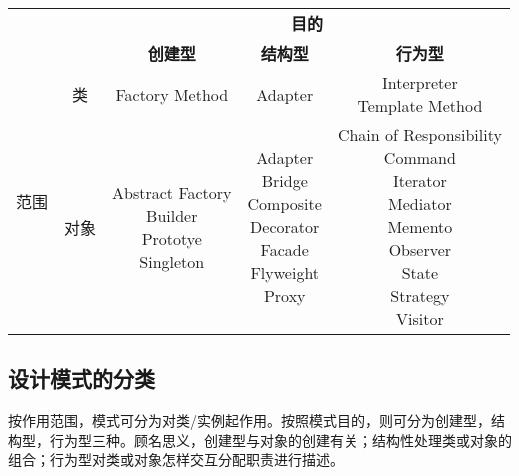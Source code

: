 \begin{table}[H]
    \centering
    \setlength{\tabcolsep}{4mm}
    \begin{tabular}{c|c|c|c|c}
        \toprule
        & & \multicolumn{3}{c}{\textbf{目的}} \\
        \cline{3-5}
        & & \textbf{创建型} & \textbf{结构型} & \textbf{行为型} \\
        \midrule
        \multirow{2}{*}{范围} & 类 & Factory Method & Adapter & \makecell{Interpreter \\ Template Method} \\
        \cline{2-5}
        & 对象 & \makecell{Abstract Factory \\ Builder \\ Prototye \\ Singleton} & \makecell{Adapter \\ Bridge \\ Composite \\ Decorator \\ Facade \\ Flyweight \\ Proxy} & \makecell{Chain of Responsibility \\ Command \\ Iterator \\ Mediator \\ Memento \\ Observer \\ State \\ Strategy \\ Visitor} \\
        \bottomrule
    \end{tabular}
\end{table}

\subsection*{设计模式的分类}

按作用范围，模式可分为对类/实例起作用。按照模式目的，则可分为创建型，结构型，行为型三种。顾名思义，创建型与对象的创建有关；结构性处理类或对象的组合；行为型对类或对象怎样交互分配职责进行描述。


